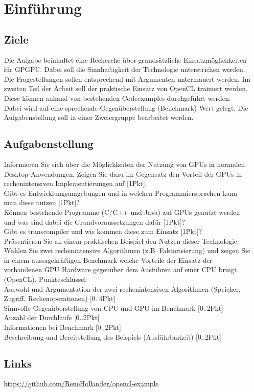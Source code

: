 
\section{Einführung}
\subsection{Ziele}
Die Aufgabe beinhaltet eine Recherche über grundsätzliche Einsatzmöglichkeiten für GPGPU. Dabei soll die Sinnhaftigkeit der Technologie unterstrichen werden. Die Fragestellungen sollen entsprechend mit Argumenten untermauert werden.
Im zweiten Teil der Arbeit soll der praktische Einsatz von OpenCL trainiert werden. Diese können anhand von bestehenden Codeexamples durchgeführt werden. Dabei wird auf eine sprechende Gegenüberstellung (Benchmark) Wert gelegt.
Die Aufgabenstellung soll in einer Zweiergruppe bearbeitet werden.


\subsection{Aufgabenstellung}
Informieren Sie sich über die Möglichkeiten der Nutzung von GPUs in normalen Desktop-Anwendungen. Zeigen Sie dazu im Gegensatz den Vorteil der GPUs in rechenintensiven Implementierungen auf [1Pkt].\\
Gibt es Entwicklungsumgebungen und in welchen Programmiersprachen kann man diese nutzen [1Pkt]?\\
Können bestehende Programme (C/C++ und Java) auf GPUs genutzt werden und was sind dabei die Grundvoraussetzungen dafür [1Pkt]?\\
 Gibt es transcompiler und wie kommen diese zum Einsatz [1Pkt]?\\

Präsentieren Sie an einem praktischen Beispiel den Nutzen dieser Technologie. Wählen Sie zwei rechenintensive Algorithmen (z.B. Faktorisierung) und zeigen Sie in einem aussagekräftigen Benchmark welche Vorteile der Einsatz der vorhandenen GPU Hardware gegenüber dem Ausführen auf einer CPU bringt (OpenCL). Punkteschlüssel:\\

Auswahl und Argumentation der zwei rechenintensiven Algorithmen (Speicher, Zugriff, Rechenoperationen) [0..4Pkt]\\
Sinnvolle Gegenüberstellung von CPU und GPU im Benchmark [0..2Pkt]\\
Anzahl der Durchläufe [0..2Pkt]\\
Informationen bei Benchmark [0..2Pkt]\\
Beschreibung und Bereitstellung des Beispiels (Ausführbarkeit) [0..2Pkt]

\subsection{Links}
\url{https://github.com/ReneHollander/opencl-example}
\clearpage
